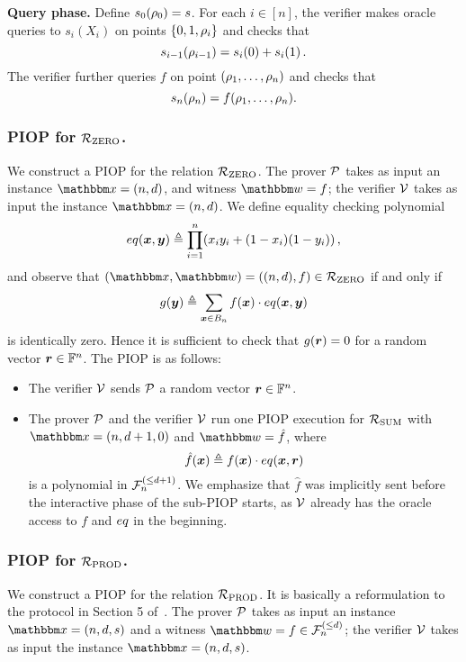 \textbf{Query phase.}
Define $s_0(\rho_{0}) = s$. For each $i \in [n]$, the verifier makes oracle queries to $s_i(X_i)$ on points
$\{0, 1, \rho_{i} \}$ and checks that
\[
  s_{i-1}(\rho_{i-1}) = s_{i}(0) + s_{i}(1) \,.  
\]
The verifier further queries $f$ on point $(\rho_{1}, \dots, \rho_{n})$ and checks that
\[
  s_n(\rho_{n}) = f(\rho_{1}, \dots, \rho_{n}).  
\]

\subsubsection*{PIOP for ${\mathcal{R}}_{\text{ZERO}}$.} 
We construct a PIOP for the relation ${\mathcal{R}}_{\text{ZERO}}$.
The prover $\mathcal{P}$ takes as input an instance $\instR = (n, d)$,
and witness $\witR = f$; the verifier $\mathcal{V}$ takes as input the 
instance $\instR = (n, d)$. We define equality checking polynomial
\[
  eq(\boldsymbol{x}, \boldsymbol{y}) \mathrel{\triangleq} \prod_{i=1}^{n} (x_iy_i + (1-x_i)(1-y_i)) \,,
\]
and observe that $(\instR, \witR) = ((n,d), f) \in \RZERO$ if and only if
\[
  g(\boldsymbol{y}) \mathrel{\triangleq} \sum_{\boldsymbol{x} \in B_{n}} f(\boldsymbol{x}) \cdot eq(\boldsymbol{x}, \boldsymbol{y})  
\]
is identically zero. Hence it is sufficient to check that $g(\boldsymbol{r}) = 0$
for a random vector $\boldsymbol{r} \in \mathbb{F}^n$. The PIOP is as follows:
\begin{itemize}
    \item The verifier $\mathcal{V}$ sends $\mathcal{P}$ a random vector $\boldsymbol{r} \in \mathbb{F}^{n}$.
    \item The prover $\mathcal{P}$ and the verifier $\mathcal{V}$ run one PIOP execution
    for ${\mathcal{R}}_{\text{SUM}}$ with $\instR = (n, d+1, 0)$ and $\witR = \hat{f}$, where
    \[
      \hat{f}(\boldsymbol{x}) \mathrel{\triangleq} f(\boldsymbol{x}) \cdot eq(\boldsymbol{x}, \boldsymbol{r}) 
    \]
    is a polynomial in ${\mathcal{F}}_{n}^{(\le{d+1})}$.
    We emphasize that $\hat{f}$ was implicitly sent before the interactive phase of the sub-PIOP starts,
    as $\mathcal{V}$ already has the oracle access to $f$ and $eq$ in the beginning.
\end{itemize}

\subsubsection*{PIOP for ${\mathcal{R}}_{\text{PROD}}$.}
We construct a PIOP for the relation ${\mathcal{R}}_{\text{PROD}}$.
It is basically a reformulation to the protocol in Section 5
of~\cite{SL20}.
The prover $\mathcal{P}$ takes as input an instance $\instR = (n, d, s)$
and a witness $\witR = f \in \bdp{n}{d}$; the verifier $\mathcal{V}$
takes as input the instance $\instR = (n, d, s)$.

